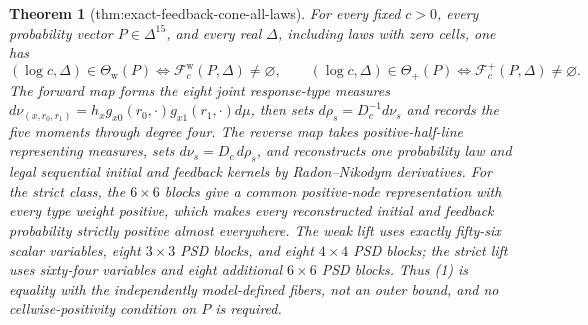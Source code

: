 \documentclass{article}
\newtheorem{theorem}{Theorem}
\begin{document}
\begin{theorem}[thm:exact-feedback-cone-all-laws]\label{thm:exact-feedback-cone-all-laws}
For every fixed \(c>0\), every probability vector \(P\in\Delta^{15}\), and every real \(\Delta\), including laws with zero cells, one has
\[
 (\log c,\Delta)\in\Theta_{\mathrm w}(P)
 \Longleftrightarrow
 \mathcal F_c^{\mathrm w}(P,\Delta)\ne\varnothing,
 \qquad
 (\log c,\Delta)\in\Theta_+(P)
 \Longleftrightarrow
 \mathcal F_c^+(P,\Delta)\ne\varnothing. \tag{1}
\]
The forward map forms the eight joint response-type measures
\(d\nu_{(x,r_0,r_1)}=h_xg_{x0}(r_0,\cdot)g_{x1}(r_1,\cdot)d\mu\), then sets \(d\rho_s=D_c^{-1}d\nu_s\) and records the five moments through degree four.  The reverse map takes positive-half-line representing measures, sets \(d\nu_s=D_c\,d\rho_s\), and reconstructs one probability law and legal sequential initial and feedback kernels by Radon--Nikodym derivatives.  For the strict class, the \(6\times6\) blocks give a common positive-node representation with every type weight positive, which makes every reconstructed initial and feedback probability strictly positive almost everywhere.  The weak lift uses exactly fifty-six scalar variables, eight \(3\times3\) PSD blocks, and eight \(4\times4\) PSD blocks; the strict lift uses sixty-four variables and eight additional \(6\times6\) PSD blocks.  Thus (1) is equality with the independently model-defined fibers, not an outer bound, and no cellwise-positivity condition on \(P\) is required.
\end{theorem}
\end{document}
